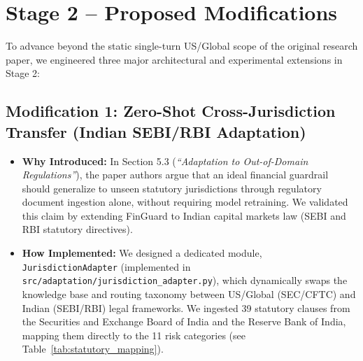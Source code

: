 \documentclass[11pt,a4paper]{article}
\begin{document}
\clearpage

\section{Stage 2 – Proposed Modifications}

To advance beyond the static single-turn US/Global scope of the original research paper, we engineered three major architectural and experimental extensions in Stage 2:

\subsection{Modification 1: Zero-Shot Cross-Jurisdiction Transfer (Indian SEBI/RBI Adaptation)}
\begin{itemize}[noitemsep]
    \item \textbf{Why Introduced:} In Section 5.3 (\textit{``Adaptation to Out-of-Domain Regulations''}), the paper authors argue that an ideal financial guardrail should generalize to unseen statutory jurisdictions through regulatory document ingestion alone, without requiring model retraining. We validated this claim by extending FinGuard to Indian capital markets law (SEBI and RBI statutory directives).
    \item \textbf{How Implemented:} We designed a dedicated module, \texttt{JurisdictionAdapter} (implemented in \nolinkurl{src/adaptation/jurisdiction_adapter.py}), which dynamically swaps the knowledge base and routing taxonomy between US/Global (SEC/CFTC) and Indian (SEBI/RBI) legal frameworks. We ingested 39 statutory clauses from the Securities and Exchange Board of India and the Reserve Bank of India, mapping them directly to the 11 risk categories (see Table~\ref{tab:statutory_mapping}).
\end{itemize}
\end{document}
